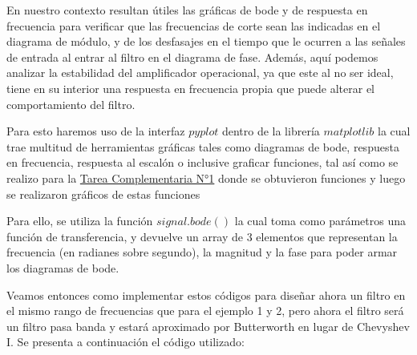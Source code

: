 \documentclass[12pt,a4paper]{article}
\begin{document}
En nuestro contexto resultan útiles las gráficas de bode y de respuesta en frecuencia para verificar que las frecuencias de corte sean las indicadas en el diagrama de módulo, y de los desfasajes en el tiempo que le ocurren a las señales de entrada al entrar al filtro en el diagrama de fase. Además, aquí podemos analizar la estabilidad del amplificador operacional, ya que este al no ser ideal, tiene en su interior una respuesta en frecuencia propia que puede alterar el comportamiento del filtro.

Para esto haremos uso de la interfaz $pyplot$ dentro de la librería $matplotlib$ la cual trae multitud de herramientas gráficas tales como diagramas de bode, respuesta en frecuencia, respuesta al escalón o inclusive graficar funciones, tal así como se realizo para la \href{https://github.com/ErnestMonja/Sintesis_de_Redes_Activas/blob/main/Tareas%20Complementarias/Tarea%20Complementaria%201%20-%20S%C3%ADntesis%20de%20Amplificadores%20Compensados/Tarea%20Complementaria%201.pdf}{Tarea Complementaria N°1} donde se obtuvieron funciones y luego se realizaron gráficos de estas funciones

Para ello, se utiliza la función $signal.bode()$ la cual toma como parámetros una función de transferencia, y devuelve un array de 3 elementos que representan la frecuencia (en radianes sobre segundo), la magnitud y la fase para poder armar los diagramas de bode.

Veamos entonces como implementar estos códigos para diseñar ahora un filtro en el mismo rango de frecuencias que para el ejemplo 1 y 2, pero ahora el filtro será un filtro pasa banda y estará aproximado por Butterworth en lugar de Chevyshev I. Se presenta a continuación el código utilizado:
\end{document}
